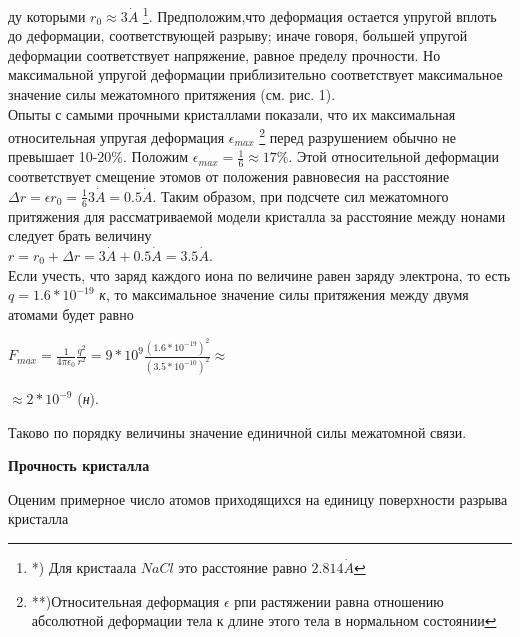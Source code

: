 \documentclass[12pt]
{article}
{\Large}
\begin{document}
\begin{minipage}{0.43\textwidth}
ду которыми \(r_{0} \approx 3{\dot{A}}\) \footnote[*)]{*) Для кристаала \(NaCl\) это расстояние равно \(2.814{\dot{A}}\)}. Предположим,что деформация остается упругой вплоть до деформации, соответствующей разрыву; иначе говоря,  большей упругой деформации соответствует напряжение, равное пределу прочности. Но максимальной упругой деформации приблизительно соответствует максимальное значение силы межатомного притяжения (см. рис. 1). \\
\hspace*{16} Опыты с самыми прочными кристаллами показали, что их максимальная относительная упругая деформация \(\epsilon_{max}\) \footnote[**)]{**)Относительная деформация \(\epsilon\) рпи растяжении равна отношению абсолютной деформации тела к длине этого тела в нормальном состоянии} перед разрушением обычно не превышает 10-20\%. Положим \(\epsilon_{max} = \frac{1}{6} \approx 17\%\).
Этой относительной деформации соответствует смещение этомов от положения равновесия на расстояние \(\Delta r = \epsilon r_{0} = \frac{1}{6}3{\dot{A}} = 0.5{\dot{A}}\).
Таким образом, при подсчете сил межатомного притяжения для рассматриваемой модели кристалла за расстояние между нонами следует брать величину \\ \(r = r_{0} + \Delta r = 3{\dot{A}} + 0.5{\dot{A}} = 3.5{\dot{A}}\).\\
\hspace*{16} Если учесть, что заряд каждого иона по величине равен заряду электрона, то есть \(q = 1.6*10^{-19}\) \textit{к}, то максимальное значение силы притяжения между двумя атомами будет равно
\begin{center}\(F_{max} = \frac{1}{4\pi \epsilon_{0}} \frac{q^2}{r^2} = 9*10^9 \frac{(1.6*10^{-19})^2}{(3.5*10^{-10})^2} \approx\) 
\end{center}
\begin{flushright}
    \(\approx 2*10^{-9}\) (\textit{н}).
\end{flushright}
Таково по порядку величины значение единичной силы межатомной связи.
\begin{flushleft}
    \textbf{Прочность кристалла}
\end{flushleft}
Оценим примерное число атомов приходящихся на единицу поверхности разрыва кристалла
\end{minipage}
\hfill
\end{document}
